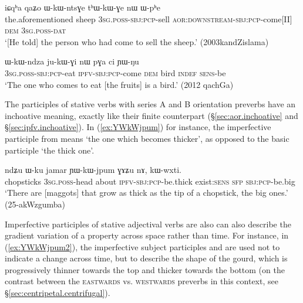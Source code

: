 \begin{exe}
\ex \label{ex:WkWntsGe.thWkWGe}
\gll iɕqʰa qaʑo ɯ-kɯ-ntsɣe tʰɯ-kɯ-ɣe nɯ ɯ-pʰe \\
the.aforementioned sheep \textsc{3sg}.\textsc{poss}-\textsc{sbj}:\textsc{pcp}-sell \textsc{aor}:\textsc{downstream}-\textsc{sbj}:\textsc{pcp}-come[II] \textsc{dem} \textsc{3sg}.\textsc{poss}-\textsc{dat} \\
\glt  `[He told] the person who had come to sell the sheep.' (2003kandZislama)
\end{exe}

\begin{exe}
\ex \label{ex:WkWndza.jukWGi}
\gll ɯ-kɯ-ndza ju-kɯ-ɣi nɯ pɣa ci ɲɯ-ŋu \\
\textsc{3sg}.\textsc{poss}-\textsc{sbj}:\textsc{pcp}-eat \textsc{ipfv}-\textsc{sbj}:\textsc{pcp}-come \textsc{dem} bird \textsc{indef} \textsc{sens}-be \\
\glt   `The one who comes to eat [the fruits] is a bird.' (2012 qachGa)
\end{exe}

The participles of stative verbs with series A and B orientation preverbs have an inchoative meaning, exactly like their finite counterpart (§\ref{sec:aor.inchoative} and §\ref{sec:ipfv.inchoative}).  In (\ref{ex:YWkWjpum}) for instance, the imperfective participle  from  means `the one which becomes thicker', as opposed to the basic participle  `the thick one'.

\begin{exe}
\ex \label{ex:YWkWjpum}
 \gll ndʑu ɯ-ku jamar ɲɯ-kɯ-jpum ɣɤʑu nɤ, kɯ-wxti.  \\
 chopsticks \textsc{3sg}.\textsc{poss}-head about \textsc{ipfv}-\textsc{sbj}:\textsc{pcp}-be.thick exist:\textsc{sens} \textsc{sfp} \textsc{sbj}:\textsc{pcp}-be.big \\
 \glt  `There are [maggots] that grow as thick as the tip of a chopstick, the big ones.' (25-akWzgumba)
\end{exe}

Imperfective participles of stative adjectival verbs are also can also describe the gradient variation of a property across space rather than time. For instance, in (\ref{ex:YWkWjpum2}), the imperfective subject participles  and  are used not to indicate a change across time, but to describe the shape of the gourd, which is progressively thinner towards the top and thicker towards the bottom (on the contrast between the \textsc{eastwards}  vs. \textsc{westwards}  preverbs in this context, see §\ref{sec:centripetal.centrifugal}).


